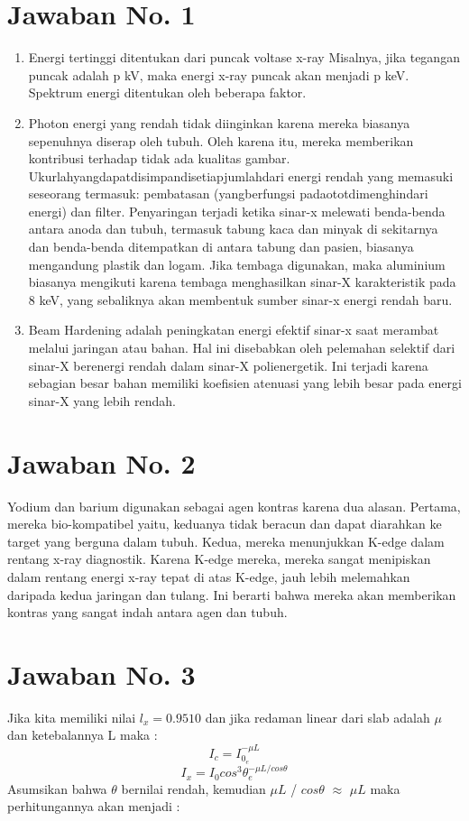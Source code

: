 \section{Jawaban No. 1}
\begin{enumerate}
\item Energi tertinggi ditentukan dari puncak voltase x-ray Misalnya, jika tegangan puncak adalah p kV, maka energi x-ray puncak akan menjadi p keV. Spektrum energi ditentukan oleh beberapa faktor. 
\item Photon energi yang rendah tidak diinginkan karena mereka biasanya sepenuhnya diserap oleh tubuh. Oleh karena itu, mereka memberikan kontribusi terhadap tidak ada kualitas gambar. Ukurlahyangdapatdisimpandisetiapjumlahdari energi rendah yang memasuki seseorang termasuk: pembatasan (yangberfungsi padaototdimenghindari energi) dan filter. Penyaringan terjadi ketika sinar-x melewati benda-benda antara anoda dan tubuh, termasuk tabung kaca dan minyak di sekitarnya dan benda-benda ditempatkan di antara tabung dan pasien, biasanya mengandung plastik dan logam. Jika tembaga digunakan, maka aluminium biasanya mengikuti karena tembaga menghasilkan sinar-X karakteristik pada 8 keV, yang sebaliknya akan membentuk sumber sinar-x energi rendah baru.
\item Beam Hardening adalah peningkatan energi efektif sinar-x saat merambat melalui jaringan atau bahan. Hal ini disebabkan oleh pelemahan selektif dari sinar-X berenergi rendah dalam sinar-X polienergetik. Ini terjadi karena sebagian besar bahan memiliki koefisien atenuasi yang lebih besar pada energi sinar-X yang lebih rendah.
\end{enumerate}

\section{Jawaban No. 2}
Yodium dan barium digunakan sebagai agen kontras karena dua alasan. Pertama, mereka bio-kompatibel yaitu, keduanya tidak beracun dan dapat diarahkan ke target yang berguna dalam tubuh. Kedua, mereka menunjukkan K-edge dalam rentang x-ray diagnostik. Karena K-edge mereka, mereka sangat menipiskan dalam rentang energi x-ray tepat di atas K-edge, jauh lebih melemahkan daripada kedua jaringan dan tulang. Ini berarti bahwa mereka akan memberikan kontras yang sangat indah antara agen dan tubuh.

\section{Jawaban No. 3}
Jika kita memiliki nilai $l_{x} = 0.9510$ dan jika redaman linear dari slab adalah $\mu$ dan ketebalannya L maka :
\begin{displaymath}
I_{c}=I_{0_e}^{-\mu L}
\end{displaymath}
\begin{displaymath}
I_{x}=I_{0}cos^{3}\theta_{e}^{-\mu L/cos \theta}
\end{displaymath}
Asumsikan bahwa $\theta$ bernilai rendah, kemudian $\mu L$ / $cos\theta$ $\approx$ $\mu L$ maka perhitungannya akan menjadi :

